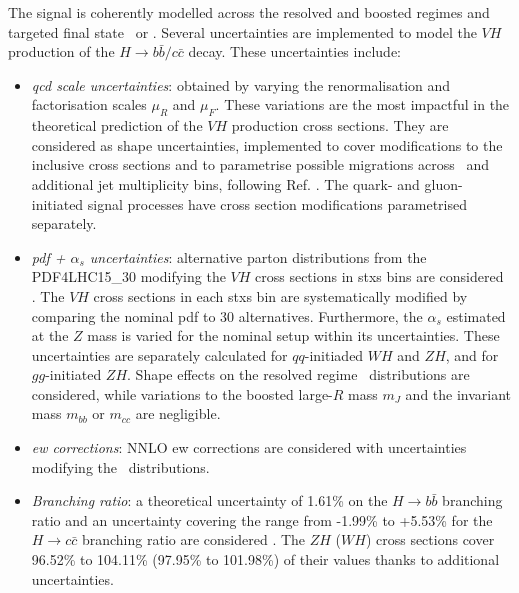 The signal is coherently modelled across the resolved and boosted regimes and targeted final state \vhb\ or \vhc. Several uncertainties are implemented to model the $VH$ production of the $H \rightarrow b\bar{b}/c\bar{c}$ decay. These uncertainties include:
\begin{itemize}[leftmargin=*]
    \item \textit{\gls{qcd} scale uncertainties}: obtained by varying the renormalisation and factorisation scales $\mu_R$ and $\mu_F$. These variations are the most impactful in the theoretical prediction of the $VH$ production cross sections. They are considered as shape uncertainties, implemented to cover modifications to the inclusive cross sections and to parametrise possible migrations across \ptv\ and additional jet multiplicity bins, following Ref. \cite{ATL-PHYS-PUB-2018-035}. The quark- and gluon-initiated signal processes have cross section modifications parametrised separately. 
    \item \textit{\gls{pdf} + $\alpha_s$ uncertainties}: alternative parton distributions from the \textsc{PDF4LHC15\_30} modifying the $VH$ cross sections in \gls{stxs} bins are considered \cite{Butterworth:2015oua}. The $VH$ cross sections in each \gls{stxs} bin are systematically modified by comparing the nominal \gls{pdf} to 30 alternatives. Furthermore, the $\alpha_s$ estimated at the $Z$ mass is varied for the nominal setup within its uncertainties. These uncertainties are separately calculated for $qq$-initiaded $WH$ and $ZH$, and for $gg$-initiated $ZH$. Shape effects on the resolved regime \ptv\ distributions are considered, while variations to the boosted large-$R$ mass $m_J$ and the invariant mass $m_{bb}$ or $m_{cc}$ are negligible.
    \item \textit{\gls{ew} corrections}: NNLO \gls{ew} corrections are considered with uncertainties modifying the \ptv\ distributions.
    \item \textit{Branching ratio}: a theoretical uncertainty of 1.61\% on the $H \rightarrow{b\bar{b}}$ branching ratio and an uncertainty covering the range from -1.99\% to +5.53\% for the $H \rightarrow{c\bar{c}}$ branching ratio are considered \cite{LHCHiggsCrossSectionWorkingGroup:2016ypw}. The $ZH$ ($WH$) cross sections cover 96.52\% to 104.11\% (97.95\% to 101.98\%) of their values thanks to additional uncertainties.

\end{itemize}
